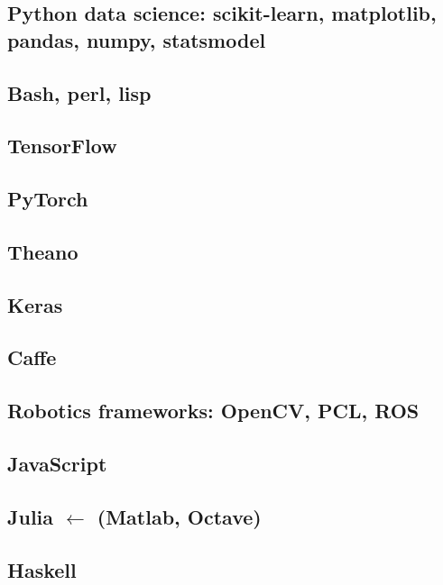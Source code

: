 %
%


\subsection{Python data science: scikit-learn, matplotlib, pandas,
              numpy, statsmodel}

\subsection{Bash, perl, lisp}

\subsection{TensorFlow}

\subsection{PyTorch}

\subsection{Theano}

\subsection{Keras}

\subsection{Caffe}

\subsection{Robotics frameworks: OpenCV, PCL, ROS}

\subsection{JavaScript}

\subsection{Julia $\leftarrow$ (Matlab, Octave)}

\subsection{Haskell}
